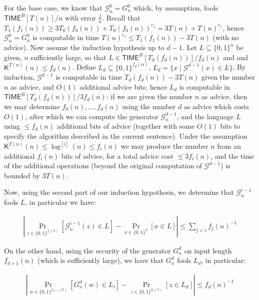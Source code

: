 \documentclass[10pt,a4paper]{article}
\begin{document}
For the base case, we know that $\mathcal{G}^{0}_{n}=G^{0}_{n}$ which, by assumption, fools ${\mathsf{TIME}}^{B}[T(n)]/n$ with error $\frac{1}{n}$. Recall that $T_{1}(f_{1}(n))\geq 3T_{0}(f_{0}(n))+T_{0}(f_{0}(n))^{c_{1}}=3T(n)+T(n)^{c_{1}}$, hence $\mathcal{G}^{0}_{n}=G^{0}_{n}$ is computable in time $T(n)^{c_{1}}\leq T_{1}(f_{1}(n))-3T(n)$ (with no advice).
Now assume the induction hypothesis up to $d-1$. Let $L\subseteq\{0,1\}^{n}$ be given, $n$ sufficiently large, so that $L\in{\mathsf{TIME}}^{B}[T_{d}(f_{d}(n))]/f_{d}(n)$ and and ${\mathsf{K}}^{T(n)}(n)\leq f_{d}(n)$.
Define $L_{d}\subseteq\{0,1\}^{f_{d}(n)}$, $L_{d}=\{x\mid\mathcal{G}^{d-1}(x)\in L\}$. By induction, $\mathcal{G}^{d-1}$ is computable in time $T_{d}(f_{d}(n))-3T(n)$ given the number $n$ as advice, and $O(1)$ additional advice bits; hence $L_{d}$ is computable in ${\mathsf{TIME}}^{B}[T_{d}(f_{d}(n))]/3f_{d}(n)$: if we are given the number $n$ as advice, then we may determine $f_{0}(n),\ldots,f_{d}(n)$ using the number $d$ as advice which costs $O(1)$, after which we can compute the generator $\mathcal{G}^{d-1}_{n}$, and the language $L$ using $\leq f_{d}(n)$ additional bits of advice (together with some $O(1)$ bits to specify the algorithm described in the current sentence). Under the assumption ${\mathsf{K}}^{T(n)}(n)\leq\log^{[i]}(n)\leq f_{i}(n)$ we may produce the number $n$ from an additional $f_{i}(n)$ bits of advice, for a total advice cost $\leq 3f_{i}(n)$, and the time of the additional operations (beyond the original computation of $\mathcal{G}^{d-1}$) is bounded by $3T(n)$.\par




Now, using the second part of our induction hypothesis, we determine that $\mathcal{G}_{n}^{i-1}$ fools $L$, in particular we have:\par


\[\begin{gathered}
|\Pr_{z\in\{0,1\}^{f_{i}(n)}}[\mathcal{G}^{i-1}_{n}(z)\in L]-\Pr_{x\in\{0,1\}^{n}}[x\in L]|\leq\sum_{j<i}f_{j}(n)^{-1}
\end{gathered}\]


On the other hand, using the security of the generator $G^{d}_{n}$ on input length $f_{d+1}(n)$ (which is sufficiently large), we have that $G^{d}_{n}$ fools $L_{d}$, in particular:\par


\[\begin{gathered}
|\Pr_{w\in\{0,1\}^{f_{d+1}(n)}}[G^{d}_{n}(w)\in L_{i}]-\Pr_{z\in\{0,1\}^{f_{d}(n)}}[z\in L_{d}]|\leq f_{d}(n)^{-1}
\end{gathered}\]
\end{document}
